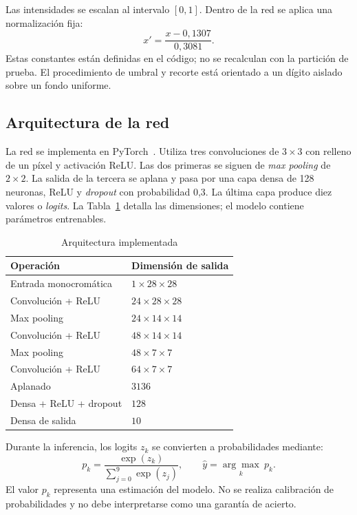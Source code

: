 \documentclass[conference]{IEEEtran}
\begin{document}
Las intensidades se escalan al intervalo $[0,1]$. Dentro de la red se aplica una normalización fija:
\begin{equation}
 x' = \frac{x-0{,}1307}{0{,}3081}.
 \label{eq:norm}
\end{equation}
Estas constantes están definidas en el código; no se recalculan con la partición de prueba. El procedimiento de umbral y recorte está orientado a un dígito aislado sobre un fondo uniforme.

\subsection{Arquitectura de la red}
La red se implementa en PyTorch~\cite{pytorch2019}. Utiliza tres convoluciones de $3\times3$ con relleno de un píxel y activación ReLU. Las dos primeras se siguen de \emph{max pooling} de $2\times2$. La salida de la tercera se aplana y pasa por una capa densa de 128 neuronas, ReLU y \emph{dropout} con probabilidad 0,3. La última capa produce diez valores o \emph{logits}. La Tabla~\ref{tab:arquitectura} detalla las dimensiones; el modelo contiene \ParametrosModelo{} parámetros entrenables.

\begin{table}[t]
\caption{Arquitectura implementada}
\label{tab:arquitectura}
\centering
\begin{tabular}{ll}
\hline
Operación & Dimensión de salida \\
\hline
Entrada monocromática & $1\times28\times28$ \\
Convolución + ReLU & $24\times28\times28$ \\
Max pooling & $24\times14\times14$ \\
Convolución + ReLU & $48\times14\times14$ \\
Max pooling & $48\times7\times7$ \\
Convolución + ReLU & $64\times7\times7$ \\
Aplanado & $3136$ \\
Densa + ReLU + dropout & $128$ \\
Densa de salida & $10$ \\
\hline
\end{tabular}
\end{table}

Durante la inferencia, los logits $z_k$ se convierten a probabilidades mediante:
\begin{equation}
 p_k = \frac{\exp(z_k)}{\sum_{j=0}^{9}\exp(z_j)},\qquad
 \hat{y}=\underset{k}{\arg\max}\ p_k.
\end{equation}
El valor $p_k$ representa una estimación del modelo. No se realiza calibración de probabilidades y no debe interpretarse como una garantía de acierto.
\end{document}
